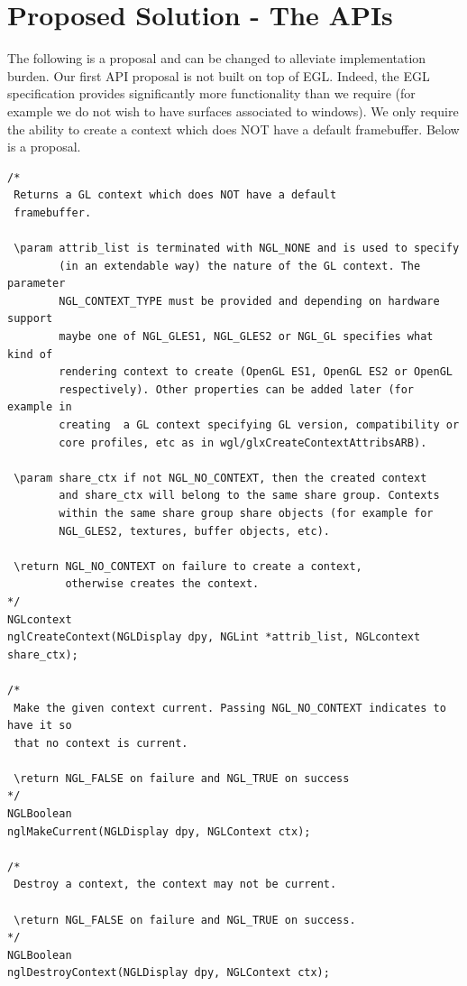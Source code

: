 \documentclass[a4paper,11pt]{article}
\begin{document}
\section{Proposed Solution - The APIs}
\begin{indenter}{2cm}

The following is a proposal and can be changed to alleviate implementation burden. Our first API proposal is not built on top of EGL. Indeed, the EGL specification provides significantly more functionality than we require (for example we do not wish to have surfaces associated to windows). We only require the ability to create a context which does NOT have a default framebuffer. Below is a proposal.

\begin{verbatim}
/*
 Returns a GL context which does NOT have a default
 framebuffer. 

 \param attrib_list is terminated with NGL_NONE and is used to specify  
        (in an extendable way) the nature of the GL context. The parameter 
        NGL_CONTEXT_TYPE must be provided and depending on hardware support 
        maybe one of NGL_GLES1, NGL_GLES2 or NGL_GL specifies what kind of 
        rendering context to create (OpenGL ES1, OpenGL ES2 or OpenGL 
        respectively). Other properties can be added later (for example in 
        creating  a GL context specifying GL version, compatibility or 
        core profiles, etc as in wgl/glxCreateContextAttribsARB).

 \param share_ctx if not NGL_NO_CONTEXT, then the created context 
        and share_ctx will belong to the same share group. Contexts 
        within the same share group share objects (for example for 
        NGL_GLES2, textures, buffer objects, etc).

 \return NGL_NO_CONTEXT on failure to create a context, 
         otherwise creates the context.
*/
NGLcontext
nglCreateContext(NGLDisplay dpy, NGLint *attrib_list, NGLcontext share_ctx);

/*
 Make the given context current. Passing NGL_NO_CONTEXT indicates to have it so 
 that no context is current.
 
 \return NGL_FALSE on failure and NGL_TRUE on success
*/
NGLBoolean
nglMakeCurrent(NGLDisplay dpy, NGLContext ctx);

/*
 Destroy a context, the context may not be current.
 
 \return NGL_FALSE on failure and NGL_TRUE on success.
*/
NGLBoolean
nglDestroyContext(NGLDisplay dpy, NGLContext ctx);


\end{verbatim}
\end{indenter}
\end{document}
